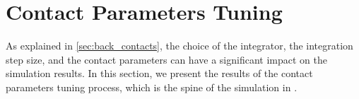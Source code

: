 \chapter{Contact Parameters Tuning}

As explained in \cref{sec:back_contacts}, the choice of the integrator, the integration step size, and the contact parameters can have a significant impact on the simulation results. In this section, we present the results of the contact parameters tuning process, which is the spine of the simulation in \jaxsim.


